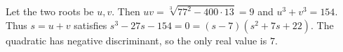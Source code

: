 Let the two roots be $u,v$. Then $uv=\sqrt[3]{77^2-400\cdot13}=9$ and $u^3+v^3=154$. Thus $s=u+v$ satisfies $s^3-27s-154=0=(s-7)(s^2+7s+22)$. The quadratic has negative discriminant, so the only real value is $\boxed7$.
